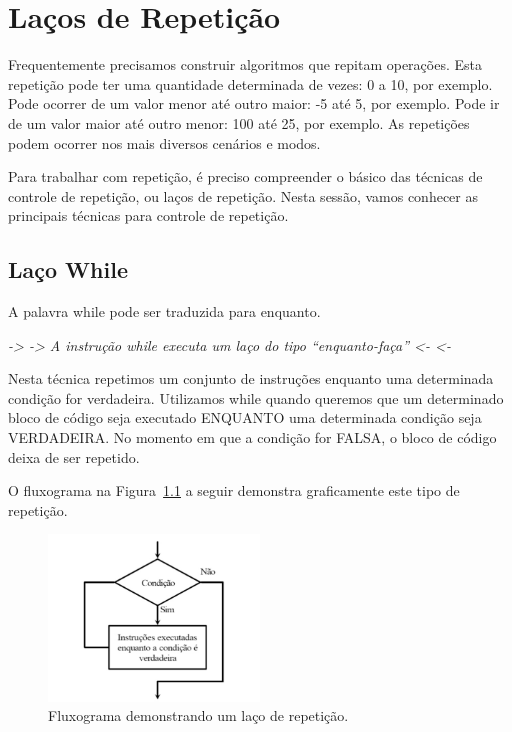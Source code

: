 \chapter{Laços de Repetição}
\label{cap:lacos}

Frequentemente precisamos construir algoritmos que repitam operações. Esta repetição pode ter uma quantidade determinada de vezes: 0 a 10, por exemplo. Pode ocorrer de um valor menor até outro maior: -5 até 5, por exemplo. Pode ir de um valor maior até outro menor: 100 até 25, por exemplo. As repetições podem ocorrer nos mais diversos cenários e modos.

Para trabalhar com repetição, é preciso compreender o básico das técnicas de controle de repetição, ou laços de repetição. Nesta sessão, vamos conhecer as principais técnicas para controle de repetição.

\section{Laço While}
A palavra while pode ser traduzida para enquanto.

\emph{-> -> A instrução while executa um laço do tipo “enquanto-faça”   <- <-}

Nesta técnica repetimos um conjunto de instruções enquanto uma determinada condição for verdadeira. Utilizamos while quando queremos que um determinado bloco de código seja executado ENQUANTO uma determinada condição seja VERDADEIRA. No momento em que a condição for FALSA, o bloco de código deixa de ser repetido.

O fluxograma na Figura~\ref{fig:lacosimples} a seguir demonstra graficamente este tipo de repetição.

\begin{figure}[h]
  \begin{center}
    \includegraphics[width=0.5\textwidth]{img/laco.png}
    \caption{Fluxograma demonstrando um laço de repetição.}
    \label{fig:lacosimples}
  \end{center}
\end{figure}


